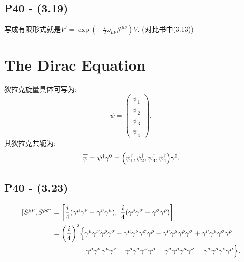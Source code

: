 \subsection{P40 - (3.19)}

写成有限形式就是$V' = \exp{(-\frac{i}{2}\omega_{\mu\nu}\mathcal{J}^{\mu\nu})}V$. (对比书中(3.13))

\section{The Dirac Equation}

狄拉克旋量具体可写为:
\begin{equation}
  \psi = \begin{pmatrix}
    \psi_1 \\ \psi_2 \\ \psi_3 \\ \psi_4
  \end{pmatrix},
\end{equation}
其狄拉克共轭为:
\begin{equation}
  \overline{\psi} = \psi^\dagger \gamma^0 = \Bigl(\psi^\dagger_1, \psi^\dagger_2, \psi^\dagger_3, \psi^\dagger_4\Bigr)\gamma^0.
\end{equation}

\subsection{P40 - (3.23)}

\begin{equation}
  \begin{aligned}
    \relax
    [S^{\mu\nu}, S^{\rho\sigma}] & = \biggl[\frac{i}{4}(\gamma^\mu \gamma^\nu - \gamma^\nu \gamma^\mu), \ \frac{i}{4}(\gamma^\rho \gamma^\sigma - \gamma^\sigma \gamma^\rho)\biggr]                                                                                           \\
                                 & = \biggl(\frac{i}{4}\biggr)^2 \Bigl\{\gamma^\mu \gamma^\nu \gamma^\rho \gamma^\sigma - \gamma^\mu \gamma^\nu \gamma^\sigma \gamma^\rho - \gamma^\nu \gamma^\mu \gamma^\rho \gamma^\sigma + \gamma^\nu \gamma^\mu \gamma^\sigma \gamma^\rho \\
                                 & \qquad \quad \ \ - \gamma^\rho \gamma^\sigma \gamma^\mu \gamma^\nu + \gamma^\rho \gamma^\sigma \gamma^\nu \gamma^\mu + \gamma^\sigma \gamma^\rho \gamma^\mu \gamma^\nu - \gamma^\sigma \gamma^\rho \gamma^\nu \gamma^\mu \Bigr\}.
  \end{aligned}
\end{equation}

